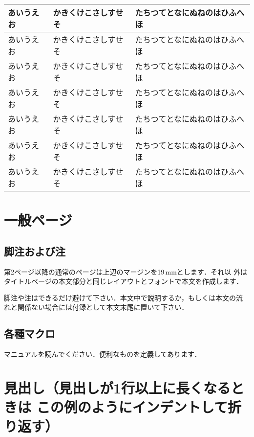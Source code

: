 \documentclass{jsce}
\begin{document}
\begin{minipage}[c]{.95\textwidth}
\begin{center}
\begin{tabular}{|p{6cm}|p{8cm}|p{8cm}|}
あいうえお & かきくけこさしすせそ & たちつてとなにぬねのはひふへほ \\ \hline
あいうえお & かきくけこさしすせそ & たちつてとなにぬねのはひふへほ \\ \hline
あいうえお & かきくけこさしすせそ & たちつてとなにぬねのはひふへほ \\ \hline
あいうえお & かきくけこさしすせそ & たちつてとなにぬねのはひふへほ \\ \hline
あいうえお & かきくけこさしすせそ & たちつてとなにぬねのはひふへほ \\ \hline
あいうえお & かきくけこさしすせそ & たちつてとなにぬねのはひふへほ \\ \hline
あいうえお & かきくけこさしすせそ & たちつてとなにぬねのはひふへほ \\ \hline
\end{tabular}
\end{center}
\end{minipage}

\vfill
\mbox{} %
\portrait
\twocolumn


\section{一般ページ}

\subsection{脚注および注}

第2ページ以降の通常のページは上辺のマージンを19\,mmとします．それ以
外はタイトルページの本文部分と同じレイアウトとフォントで本文を作成します．

脚注や注はできるだけ避けて下さい．本文中で説明するか，もしくは本文の流
れと関係ない場合には付録として本文末尾に置いて下さい．

\subsection{各種マクロ}

マニュアルを読んでください．便利なものを定義してあります．

\section{見出し（見出しが1行以上に長くなるときは
この例のようにインデントして折り返す）}
\end{document}
